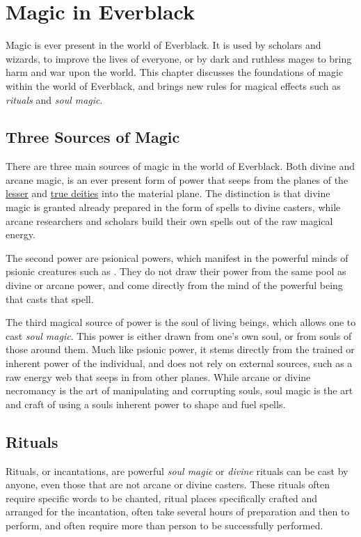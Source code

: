\chapter{Magic in Everblack}
\label{sec:Magic}

Magic is ever present in the world of Everblack. It is used by scholars and
wizards, to improve the lives of everyone, or by dark and ruthless mages to
bring harm and war upon the world. This chapter discusses the foundations of
magic within the world of Everblack, and brings new rules for magical effects
such as \emph{rituals} and \emph{soul magic}.

\section{Three Sources of Magic}

There are three main sources of magic in the world of Everblack. Both divine
and arcane magic, is an ever present form of power that seeps from the planes
of the \hyperref[sec:Lesser Deities]{lesser} and \hyperref[sec:True
  Deities]{true deities} into the material plane. The distinction is that
divine magic is granted already prepared in the form of spells to divine
casters, while arcane researchers and scholars build their own spells out of
the raw magical energy.

The second power are psionical powers, which manifest in the powerful minds of
psionic creatures such as . They do not draw their power
from the same pool as divine or arcane power, and come directly from the mind
of the powerful being that casts that spell.

The third magical source of power is the soul of living beings, which allows
one to cast \emph{soul magic}. This power is either drawn from one's own soul,
or from souls of those around them. Much like psionic power, it stems directly
from the trained or inherent power of the individual, and does not rely on
external sources, such as a raw energy web that seeps in from other planes.
While arcane or divine necromancy is the art of manipulating and corrupting
souls, soul magic is the art and craft of using a souls inherent power to
shape and fuel spells.

\section{Rituals}
\label{sec:Rituals}

Rituals, or incantations, are powerful \emph{soul magic} or \emph{divine}
rituals can be cast by anyone, even those that are not arcane or divine
casters. These rituals often require specific words to be chanted, ritual
places specifically crafted and arranged for the incantation, often take
several hours of preparation and then to perform, and often require more than
person to be successfully performed.

